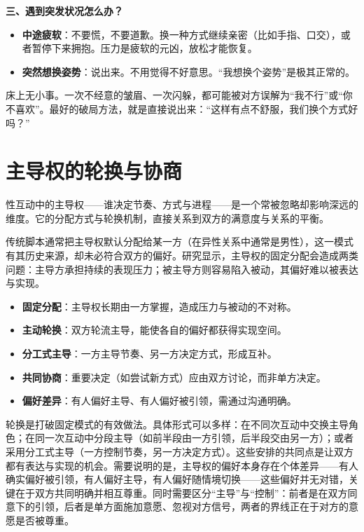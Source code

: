 \documentclass[12pt,UTF8]{ctexbook}
\begin{document}
\textbf{三、遇到突发状况怎么办？}

\begin{itemize}
\item \textbf{中途疲软}：不要慌，不要道歉。换一种方式继续亲密（比如手指、口交），或者暂停下来拥抱。压力是疲软的元凶，放松才能恢复。
\item \textbf{突然想换姿势}：说出来。不用觉得不好意思。“我想换个姿势”是极其正常的。
\end{itemize}

\begin{tcolorbox}[colback=pink!5!white,colframe=red!50!black,title=贴心小叮咛]
床上无小事。一次不经意的皱眉、一次闪躲，都可能被对方误解为“我不行”或“你不喜欢”。最好的破局方法，就是直接说出来：“这样有点不舒服，我们换个方式好吗？”
\end{tcolorbox}

\section{主导权的轮换与协商}

性互动中的主导权——谁决定节奏、方式与进程——是一个常被忽略却影响深远的维度。它的分配方式与轮换机制，直接关系到双方的满意度与关系的平衡。

传统脚本通常把主导权默认分配给某一方（在异性关系中通常是男性），这一模式有其历史来源，却未必符合双方的偏好。研究显示，主导权的固定分配会造成两类问题：主导方承担持续的表现压力；被主导方则容易陷入被动，其偏好难以被表达与实现。

\begin{itemize}
\item \textbf{固定分配}：主导权长期由一方掌握，造成压力与被动的不对称。
\item \textbf{主动轮换}：双方轮流主导，能使各自的偏好都获得实现空间。
\item \textbf{分工式主导}：一方主导节奏、另一方决定方式，形成互补。
\item \textbf{共同协商}：重要决定（如尝试新方式）应由双方讨论，而非单方决定。
\item \textbf{偏好差异}：有人偏好主导、有人偏好被引领，需通过沟通明确。
\end{itemize}

轮换是打破固定模式的有效做法。具体形式可以多样：在不同次互动中交换主导角色；在同一次互动中分段主导（如前半段由一方引领，后半段交由另一方）；或者采用分工式主导（一方控制节奏，另一方决定方式）。这些安排的共同点是让双方都有表达与实现的机会。需要说明的是，主导权的偏好本身存在个体差异——有人确实偏好被引领，有人偏好主导，有人偏好随情境切换——这些偏好并无对错，关键在于双方共同明确并相互尊重。同时需要区分“主导”与“控制”：前者是在双方同意下的引领，后者是单方面施加意愿、忽视对方信号，两者的界线正在于对方的意愿是否被尊重。
\end{document}
